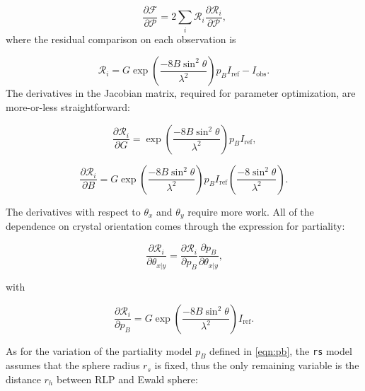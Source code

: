 \documentclass[12pt, letterpaper]{article}
\begin{document}
    \begin{equation}
    \frac{\partial\mathscr{F}}{\partial\mathscr{P}} = 2\sum_{i} \limits
    \mathscr{R}_i\dfrac{\partial\mathscr{R}_i}{\partial\mathscr{P}}
    \text{,}
    \label{eqn:genFP}
  \end{equation}
where the residual comparison on each observation is 

  \begin{equation}
 \mathscr{R}_i =  
    G  \exp(\dfrac{-8B\sin^2\theta}{\lambda^2}) p_B I_{\mathrm{ref}} - I_{\mathrm{obs}}
    \text{.}
    \end{equation}
The derivatives in the Jacobian matrix, required for parameter optimization, are more-or-less
straightforward:

    \begin{equation}
    \frac{\partial\mathscr{R}_i}{\partial G} = 
    \exp(\dfrac{-8B\sin^2\theta}{\lambda^2}) p_B I_{\mathrm{ref}}
    \text{,}
    \label{eqn:dG}
  \end{equation}

     \begin{equation}
    \frac{\partial\mathscr{R}_i}{\partial B} = 
    G  \exp(\dfrac{-8B\sin^2\theta}{\lambda^2}) p_B I_{\mathrm{ref}}
    \left( \dfrac{-8\sin^2\theta}{\lambda^2}\right)
    \text{.}
    \label{eqn:dB}
  \end{equation}

  \par The derivatives with respect to $\theta_{x}$ and $\theta_{y}$ require more work.  All of the
  dependence on crystal orientation comes through the expression for partiality:
  
      \begin{equation}
    \frac{\partial\mathscr{R}_i}{\partial \theta_{x\mathrm{|}y}} = 
  \frac{\partial\mathscr{R}_i}{\partial p_B}
   \frac{\partial p_B} {\partial \theta_{x\mathrm{|}y}}
    \text{,}
    \label{eqn:dthxy}
  \end{equation}

with

      \begin{equation} 
  \frac{\partial\mathscr{R}_i}{\partial p_B} =
  G  \exp(\dfrac{-8B\sin^2\theta}{\lambda^2}) I_{\mathrm{ref}}
    \text{.}
    \label{eqn:P_terms}
  \end{equation}

As for the variation of the partiality model $p_B$ defined in \eqref{eqn:pb}, the {\tt rs}
model assumes that the sphere radius $r_s$ is fixed, thus the only remaining variable is the
distance  $r_h$ between RLP and Ewald sphere:
\end{document}
